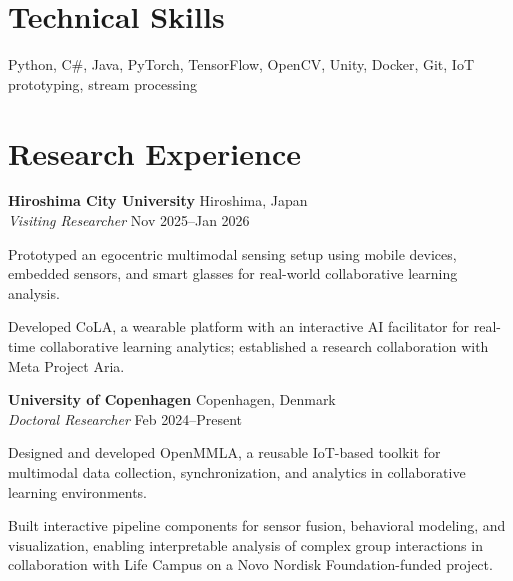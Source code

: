 \documentclass[11pt,letterpaper]{report}
\newcommand{\listitemspace}{0.25em}
\begin{document}
    \section*{Technical Skills}

    Python, C\#, Java, PyTorch, TensorFlow, OpenCV, Unity, Docker, Git, IoT prototyping, stream processing

    \section*{Research Experience}

    \noindent \textbf{Hiroshima City University} \hfill Hiroshima, Japan \\
    \textit{Visiting Researcher} \hfill Nov 2025--Jan 2026
    \begin{list}{\textbullet}{\setlength{\leftmargin}{1.2em}
                   \setlength{\labelsep}{0.5em}
                   \setlength{\itemsep}{\listitemspace}
                   \setlength{\parsep}{\listitemspace}}
        \item Prototyped an egocentric multimodal sensing setup using mobile devices, embedded sensors, and smart glasses for real-world collaborative learning analysis.
        \item Developed CoLA, a wearable platform with an interactive AI facilitator for real-time collaborative learning analytics; established a research collaboration with Meta Project Aria.
    \end{list}
    \vspace{0.8em}

    \noindent \textbf{University of Copenhagen} \hfill Copenhagen, Denmark \\
    \textit{Doctoral Researcher} \hfill Feb 2024--Present
    \begin{list}{\textbullet}{\setlength{\leftmargin}{1.2em}
                   \setlength{\labelsep}{0.5em}
                   \setlength{\itemsep}{\listitemspace}
                   \setlength{\parsep}{\listitemspace}}
        \item Designed and developed OpenMMLA, a reusable IoT-based toolkit for multimodal data collection, synchronization, and analytics in collaborative learning environments.
        \item Built interactive pipeline components for sensor fusion, behavioral modeling, and visualization, enabling interpretable analysis of complex group interactions in collaboration with Life Campus on a Novo Nordisk Foundation-funded project.
    \end{list}
    \vspace{0.8em}
\end{document}
